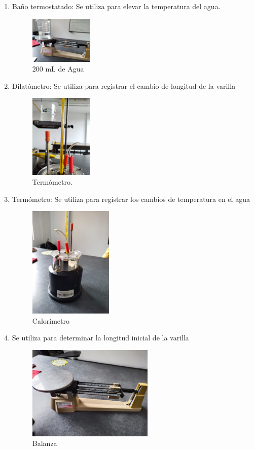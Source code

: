 \documentclass[journal,transmag]{IEEEtran}
\begin{document}
	\begin{enumerate}
	
  \item Baño termostatado: Se utiliza para elevar la temperatura del agua.

		\begin{figure}[!h]
			\center
			\includegraphics[width=3cm]{img/agua.jpeg}
			\caption{200 mL de Agua}
			\label{f1}
		\end{figure}
  \item Dilatómetro: Se utiliza para registrar el cambio de longitud de la varilla
		\begin{figure}[!h]
			\center
			\includegraphics[width=3cm]{img/termometro.jpeg}
			\caption{Termómetro.}
			\label{f2}
		\end{figure}
  \item Termómetro: Se utiliza para registrar los cambios de temperatura en el agua
		\begin{figure}[!h]
			\center
			\includegraphics[width=4cm]{img/calorimetro.jpeg}
			\caption{Calorímetro}
			\label{f3}
		\end{figure}
 \item Se utiliza para determinar la longitud inicial de la varilla
			\begin{figure}[!h]
				\center
				\includegraphics[width=6cm]{img/pesa.jpeg}
				\caption{Balanza}
				\label{f4}
			\end{figure}


	\end{enumerate}
\end{document}
